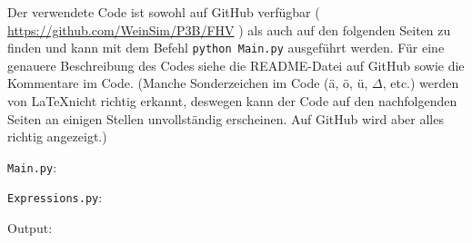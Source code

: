 \documentclass{article}
\newcommand{\githuburl}{
    \url{https://github.com/WeinSim/P3B/FHV}
}
\begin{document}
Der verwendete Code ist sowohl auf GitHub verfügbar (\githuburl) als auch auf den
folgenden Seiten zu finden und kann mit dem Befehl \texttt{python Main.py}
ausgeführt werden. Für eine genauere Beschreibung des Codes siehe die README-Datei
auf GitHub sowie die Kommentare im Code.
(Manche Sonderzeichen im Code (ä, ö, ü, $\Delta$, etc.) werden von \LaTeX nicht
richtig erkannt, deswegen kann der Code auf den nachfolgenden Seiten an einigen
Stellen unvollständig erscheinen. Auf GitHub wird aber alles richtig angezeigt.)

\newpage


\verb|Main.py|:

\newpage

\verb|Expressions.py|:

\newpage

Output:

\end{document}
